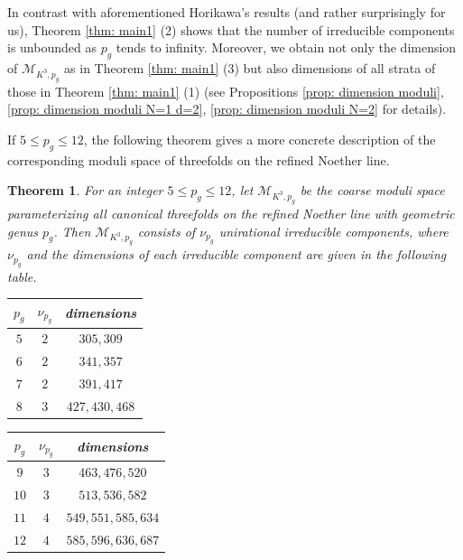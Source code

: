 \documentclass[a4paper,11pt]{amsart}
\newcommand{\M}{\ensuremath{\mathcal{M}}}
\newtheorem{thm}{Theorem}[section]
\theoremstyle{definition}
\theoremstyle{remark}
\numberwithin{equation}{section}
\begin{document}
In contrast with aforementioned Horikawa's results (and rather surprisingly for us), Theorem \ref{thm: main1} (2) shows that the number of irreducible components is unbounded as $p_g$ tends to infinity. Moreover, we obtain not only the dimension of $\M_{K^3, p_g}$ as in Theorem \ref{thm: main1} (3) but also dimensions of all strata of those in Theorem \ref{thm: main1} (1) (see Propositions \ref{prop: dimension moduli}, \ref{prop: dimension moduli N=1 d=2}, \ref{prop: dimension moduli N=2} for details). 

If $5 \le p_g \le 12$, the following theorem gives a more concrete description of the corresponding moduli space of threefolds on the refined Noether line.

\begin{thm} \label{thm: main2}
    For an integer $5 \le p_g \le 12$, let $\M_{K^3,p_g}$ be the coarse moduli space parameterizing all canonical threefolds on the refined Noether line with geometric genus $p_g$. Then $\M_{K^3,p_g}$ consists of $\nu_{p_g}$ unirational irreducible components, where $\nu_{p_g}$ and the dimensions of each irreducible component are given in the following table.
    \begin{table}[htbp]
            \centering
            \begin{tabular}{ccc}
            $p_g$ & $\nu_{p_g}$ & \emph{dimensions} \\
            \hline
            $5$ & $2$ & $305,309$ \\
            $6$ & $2$ & $341,357$ \\
            $7$ & $2$ & $391,417$ \\
            $8$ & $3$ & $427,430,468$
            \end{tabular}
            \quad\quad
            \begin{tabular}{ccc}
            $p_g$ & $\nu_{p_g}$ & \emph{dimensions} \\
            \hline
            $9$ & $3$ & $463,476,520$ \\
            $10$ & $3$ & $513,536,582$ \\
            $11$ & $4$ & $549,551,585,634$ \\
            $12$ & $4$ & $585,596,636,687$
            \end{tabular}
    \end{table}
\end{thm}
\end{document}
